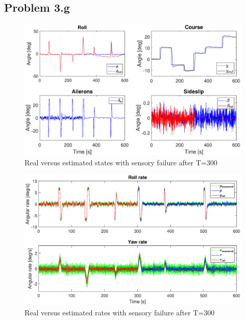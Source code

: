 \subsection*{Problem 3.g}

\begin{figure}[h!]
    \centering
    \includegraphics[width=\textwidth]{figures/prob3g.eps}
    \caption{Real versus estimated states with sensory failure after T=300}
    \label{fig:3g}
\end{figure}
\begin{figure}[h!]
    \centering
    \includegraphics[width=\textwidth]{figures/prob3g_rates.eps}
    \caption{Real versus estimated rates with sensory failure after T=300}
    \label{fig:3g_rates}
\end{figure}

